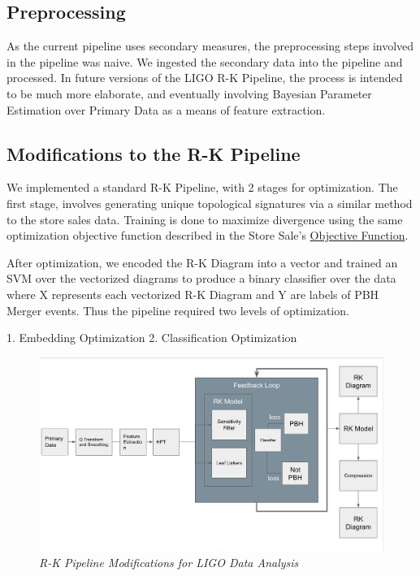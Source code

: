     \subsection{Preprocessing}

    As the current pipeline uses secondary measures, the preprocessing steps involved in the pipeline was naive. We ingested the secondary data into the pipeline and processed. In future versions of the LIGO R-K Pipeline, the process is intended to be much more elaborate, and eventually involving Bayesian Parameter Estimation over Primary Data as a means of feature extraction.

    \subsection{Modifications to the R-K Pipeline}

    We implemented a standard R-K Pipeline, with 2 stages for optimization. The first stage, involves generating unique topological signatures via a similar method to the store sales data. Training is done to maximize divergence using the same optimization objective function described in the Store Sale's \hyperref[sec:ObjectiveFunction]{Objective Function}.

    After optimization, we encoded the R-K Diagram into a vector and trained an SVM over the vectorized diagrams to produce a binary classifier over the data where X represents each vectorized R-K Diagram and Y are labels of PBH Merger events. Thus the pipeline required two levels of optimization.

    1. Embedding Optimization
    2. Classification Optimization

    \begin{figure}[H]
        \centering
        \includegraphics[width=1.0\linewidth]{images/ligo_pipeline.png}
        \caption{\textit{R-K Pipeline Modifications for LIGO Data Analysis}}
        \label{fig:ligo_pipeline_fig}
    \end{figure}

